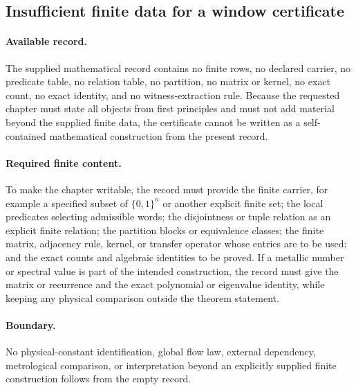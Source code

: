 \subsection{Insufficient finite data for a window certificate}\label{sec:window-fibonacci-cube-disjoint-tuple-metallic-certificate-insufficient-data}
\paragraph{Available record.} The supplied mathematical record contains no finite rows, no declared carrier, no predicate table, no relation table, no partition, no matrix or kernel, no exact count, no exact identity, and no witness-extraction rule. Because the requested chapter must state all objects from first principles and must not add material beyond the supplied finite data, the certificate cannot be written as a self-contained mathematical construction from the present record.
\paragraph{Required finite content.} To make the chapter writable, the record must provide the finite carrier, for example a specified subset of $\{0,1\}^n$ or another explicit finite set; the local predicates selecting admissible words; the disjointness or tuple relation as an explicit finite relation; the partition blocks or equivalence classes; the finite matrix, adjacency rule, kernel, or transfer operator whose entries are to be used; and the exact counts and algebraic identities to be proved. If a metallic number or spectral value is part of the intended construction, the record must give the matrix or recurrence and the exact polynomial or eigenvalue identity, while keeping any physical comparison outside the theorem statement.
\paragraph{Boundary.} No physical-constant identification, global flow law, external dependency, metrological comparison, or interpretation beyond an explicitly supplied finite construction follows from the empty record.